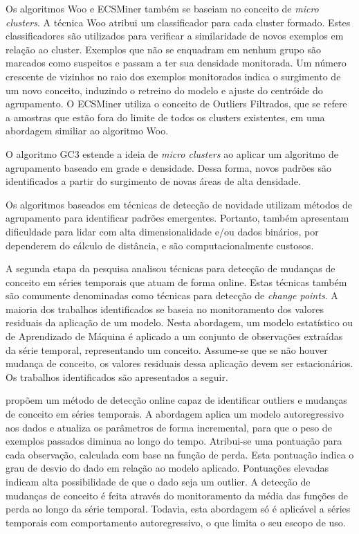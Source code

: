 \documentclass[msc, classic, a4paper]{ufbathesis}
\begin{document}
Os algoritmos Woo \cite{Lee:Wang:Ryu:2007} e ECSMiner \cite{Masud:2011:CNC:1978259.1978529} também se baseiam no conceito de \textit{micro clusters}. A técnica Woo atribui um classificador para cada cluster formado. Estes classificadores são utilizados para verificar a similaridade de novos exemplos em relação ao cluster. Exemplos que não se enquadram em nenhum grupo são marcados como suspeitos e passam a ter sua densidade monitorada. Um número crescente de vizinhos no raio dos exemplos monitorados indica o surgimento de um novo conceito, induzindo o retreino do modelo e ajuste do centróide do agrupamento.
O ECSMiner \cite{Masud:2011:CNC:1978259.1978529} utiliza o conceito de Outliers Filtrados, que se refere a amostras que estão fora do limite de todos os clusters existentes, em uma abordagem similiar ao algoritmo Woo.

O algoritmo GC3 \cite{Sethi2016b:GC3} estende a ideia de \textit{micro clusters} ao aplicar um algoritmo de agrupamento baseado em grade e densidade. Dessa forma, novos padrões são identificados a partir do surgimento de novas áreas de alta densidade.

Os algoritmos baseados em técnicas de detecção de novidade utilizam métodos de agrupamento para identificar padrões emergentes. Portanto, também apresentam dificuldade para lidar com alta dimensionalidade e/ou dados binários, por dependerem do cálculo de distância, e são computacionalmente custosos.

A segunda etapa da pesquisa analisou técnicas para detecção de mudanças de conceito em séries temporais que atuam de forma online. Estas técnicas também são comumente denominadas como técnicas para detecção de \textit{change points}. A maioria dos trabalhos identificados se baseia no monitoramento dos valores residuais da aplicação de um modelo. Nesta abordagem, um modelo estatístico ou de Aprendizado de Máquina é aplicado a um conjunto de observações extraídas da série temporal, representando um conceito.
Assume-se que se não houver mudança de conceito, os valores residuais dessa aplicação devem ser estacionários. Os trabalhos identificados são apresentados a seguir.

 propõem um método de detecção online capaz de identificar outliers e mudanças de conceito em séries temporais.
A abordagem aplica um modelo autoregressivo aos dados e atualiza os parâmetros de forma incremental, para que o peso de exemplos passados diminua ao longo do tempo. Atribui-se uma pontuação para cada observação, calculada com base na função de perda. Esta pontuação indica o grau de desvio do dado em relação ao modelo aplicado. Pontuações elevadas indicam alta possibilidade de que o dado seja um outlier. A detecção de mudanças de conceito é feita através do monitoramento da média das funções de perda ao longo da série temporal. Todavia, esta abordagem só é aplicável a séries temporais com comportamento autoregressivo, o que limita o seu escopo de uso.
\end{document}
